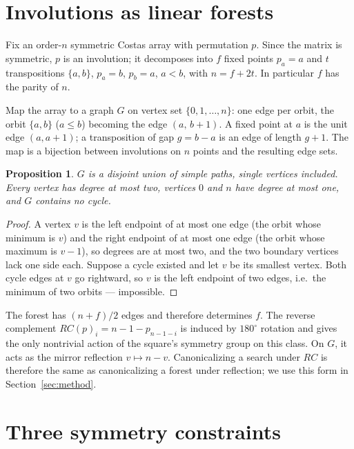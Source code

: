 \documentclass[11pt]{article}
\newtheorem{proposition}{Proposition}
\begin{document}
\section{Involutions as linear forests}
\label{sec:forest}

Fix an order-$n$ symmetric Costas array with permutation $p$.  Since the
matrix is symmetric, $p$ is an involution; it decomposes into $f$ fixed
points $p_a=a$ and $t$ transpositions $\{a,b\}$, $p_a=b$, $p_b=a$, $a<b$,
with $n=f+2t$.  In particular $f$ has the parity of $n$.

Map the array to a graph $G$ on vertex set $\{0,1,\ldots,n\}$: one edge
per orbit, the orbit $\{a,b\}$ ($a\leq b$) becoming the edge $(a,\,b+1)$.
A fixed point at $a$ is the unit edge $(a,a+1)$; a transposition of gap
$g=b-a$ is an edge of length $g+1$.  The map is a bijection between
involutions on $n$ points and the resulting edge sets.

\begin{proposition}
\label{prop:forest}
$G$ is a disjoint union of simple paths, single vertices included.  Every vertex has degree at most
two, vertices $0$ and $n$ have degree at most one, and $G$ contains no
cycle.
\end{proposition}

\begin{proof}
A vertex $v$ is the left endpoint of at most one edge (the orbit whose
minimum is $v$) and the right endpoint of at most one edge (the orbit
whose maximum is $v-1$), so degrees are at most two, and the two boundary
vertices lack one side each.  Suppose a cycle existed and let $v$ be its
smallest vertex.  Both cycle edges at $v$ go rightward, so $v$ is the left
endpoint of two edges, i.e.\ the minimum of two orbits --- impossible.
\end{proof}

The forest has $(n+f)/2$ edges and therefore determines $f$.  The reverse complement
$RC(p)_i = n-1-p_{n-1-i}$ is induced by $180^\circ$ rotation and gives
the only nontrivial action of the square's symmetry group on this class.
On $G$, it acts as the mirror reflection $v\mapsto n-v$.
Canonicalizing a search under $RC$ is
therefore the same as canonicalizing a forest under reflection; we use
this form in Section~\ref{sec:method}.

\section{Three symmetry constraints}
\label{sec:lemmas}
\end{document}
